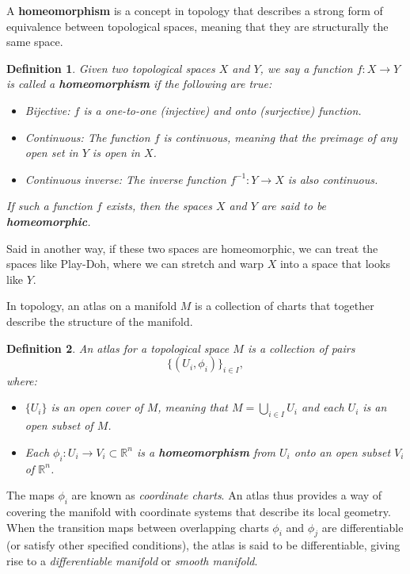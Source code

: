 \documentclass{article}
\newtheorem{definition}{Definition}
\begin{document}
A \textbf{homeomorphism} is a concept in topology that describes a strong form of equivalence between topological spaces, meaning that they are structurally the same space.
\begin{definition}
		Given two topological spaces \( X \) and \( Y \), we say a function \( f: X \rightarrow Y \) is called a \textbf{homeomorphism} if the following are true:

		\begin{itemize}
				\item Bijective: \( f \) is a one-to-one (injective) and onto (surjective) function.
				\item Continuous: The function \( f \) is continuous, meaning that the preimage of any open set in \( Y \) is open in \( X \).
				\item Continuous inverse: The inverse function \( f^{-1}: Y \to X \) is also continuous.
\end{itemize}

If such a function \( f \) exists, then the spaces \( X \) and \( Y \) are said to be \textbf{homeomorphic}.
\end{definition}	

Said in another way, if these two spaces are homeomorphic, we can treat the spaces like Play-Doh, where we can stretch and warp $X$ into a space that looks like $Y$.  

In topology, an atlas on a manifold \( M \) is a collection of charts that together describe the structure of the manifold.

\begin{definition}
		An atlas for a topological space \( M \) is a collection of pairs \[ \{(U_i, \phi_i)\}_{i \in I}, \] where:

		\begin{itemize}
				\item\( \{U_i\} \) is an open cover of \( M \), meaning that \( M = \bigcup_{i \in I} U_i \) and each \( U_i \) is an open subset of \( M \).
				\item Each \( \phi_i: U_i \to V_i \subset \mathbb{R}^n \) is a \textbf{homeomorphism} from \( U_i \) onto an open subset \( V_i \) of \( \mathbb{R}^n \).
		\end{itemize}
\end{definition}
The maps \( \phi_i \) are known as \emph{coordinate charts}. An atlas thus provides a way of covering the manifold with coordinate systems that describe its local geometry. When the transition maps between overlapping charts \( \phi_i \) and \( \phi_j \) are differentiable (or satisfy other specified conditions), the atlas is said to be differentiable, giving rise to a \emph{differentiable manifold} or \emph{smooth manifold}.
\end{document}
